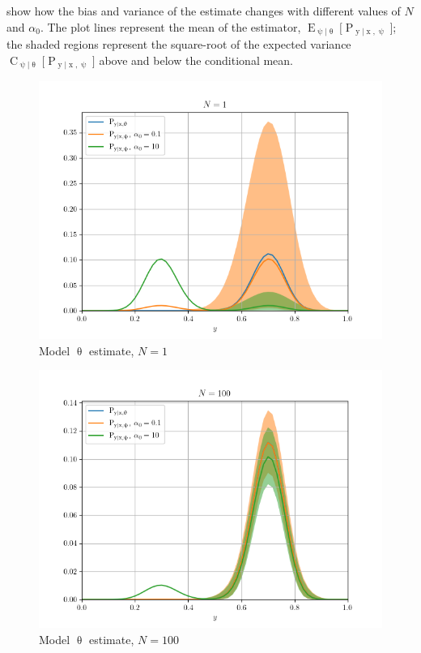 \documentclass[12pt]{report}
\DeclareMathOperator{\xrm}{\mathrm{x}}
\DeclareMathOperator{\yrm}{\mathrm{y}}
\DeclareMathOperator{\Prm}{\mathrm{P}}
\DeclareMathOperator{\Erm}{\mathrm{E}}
\DeclareMathOperator{\Crm}{\mathrm{C}}
\begin{document}
 show how the bias and variance of the estimate changes with different values of $N$ and $\alpha_0$. The plot lines represent the mean of the estimator, $\Erm_{\uppsi | \uptheta}\big[ \Prm_{\yrm | \xrm,\uppsi} \big]$; the shaded regions represent the square-root of the expected variance $\Crm_{\uppsi | \uptheta}\big[ \Prm_{\yrm | \xrm,\uppsi} \big]$ above and below the conditional mean. 
\begin{figure}
\centering
\includegraphics[width=0.8\linewidth]{model_est/N_1.png}
\caption{Model $\uptheta$ estimate, $N=1$}
\label{fig:model_est/N_1}
\end{figure}
\begin{figure}
\centering
\includegraphics[width=0.8\linewidth]{model_est/N_100.png}
\caption{Model $\uptheta$ estimate, $N=100$}
\label{fig:model_est/N_100}
\end{figure}
\end{document}
